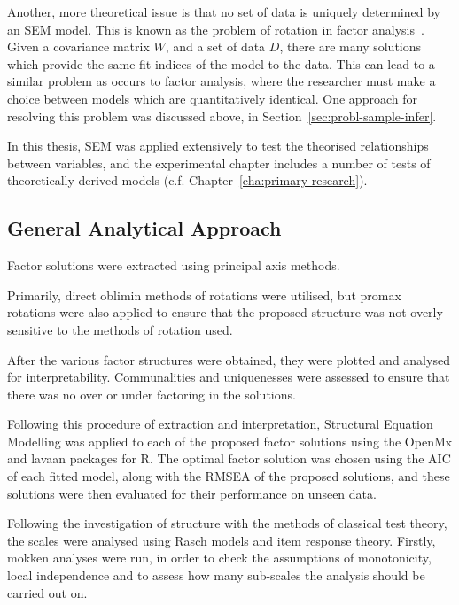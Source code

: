 Another, more theoretical issue is that no set of data is uniquely determined by an SEM model. This is known as the problem of rotation in factor analysis~\cite{maccallum2000applications}. Given a covariance matrix $W$, and a set of data $D$, there are many solutions which provide the same fit indices of the model to the data. This can lead to a similar problem as occurs to factor analysis, where the researcher must make a choice between models which are quantitatively identical. One approach for resolving this problem was discussed above, in Section~\ref{sec:probl-sample-infer}.

In this thesis, SEM was applied extensively to test the theorised relationships between variables, and the experimental chapter includes a number of tests of theoretically derived models (c.f. Chapter~\ref{cha:primary-research}).

\subsection{General Analytical Approach}
\label{sec:gener-analyt-appr}


Factor solutions were extracted using principal axis methods.

Primarily, direct oblimin methods of rotations were utilised, but promax rotations were also applied to ensure that the proposed structure was not overly sensitive to the methods of rotation used.

After the various factor structures were obtained, they were plotted and analysed for interpretability. Communalities and uniquenesses were assessed to ensure that there was no over or under factoring in the solutions. %

Following this procedure of extraction and interpretation, Structural Equation Modelling was applied to each of the proposed factor solutions using the OpenMx and lavaan packages for R. The optimal factor solution was chosen using the AIC of each fitted model, along with the RMSEA of the proposed solutions, and these solutions were then evaluated for their performance on unseen data. 


Following the investigation of structure with the methods of classical test theory, the scales were analysed using Rasch models and item response theory. Firstly, mokken analyses were run, in order to check the assumptions of monotonicity, local independence and to assess how many sub-scales the analysis should be carried out on. 

